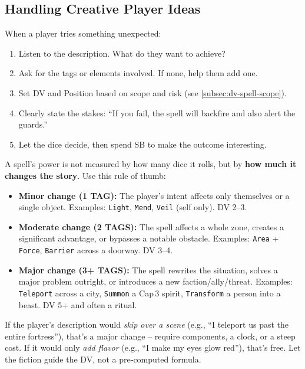 \subsection*{Handling Creative Player Ideas}
When a player tries something unexpected:
\begin{enumerate}
  \item Listen to the description. What do they want to achieve?
  \item Ask for the tags or elements involved. If none, help them add one.
  \item Set DV and Position based on scope and risk (see \ref{subsec:dv-spell-scope}).
  \item Clearly state the stakes: ``If you fail, the spell will backfire and also alert the guards.''
  \item Let the dice decide, then spend SB to make the outcome interesting.
\end{enumerate}

\begin{tcolorbox}[
  colback=yellow!5,
  colframe=yellow!75!black,
  title=When in Doubt, Measure Tags by Narrative Impact,
  fonttitle=\bfseries
]
A spell’s power is not measured by how many dice it rolls, but by \textbf{how much it changes the story}. Use this rule of thumb:

\begin{itemize}
  \item \textbf{Minor change (1 TAG):} The player’s intent affects only themselves or a single object. Examples: \texttt{Light}, \texttt{Mend}, \texttt{Veil} (self only). DV 2–3.
  \item \textbf{Moderate change (2 TAGS):} The spell affects a whole zone, creates a significant advantage, or bypasses a notable obstacle. Examples: \texttt{Area} + \texttt{Force}, \texttt{Barrier} across a doorway. DV 3–4.
  \item \textbf{Major change (3+ TAGS):} The spell rewrites the situation, solves a major problem outright, or introduces a new faction/ally/threat. Examples: \texttt{Teleport} across a city, \texttt{Summon} a Cap 3 spirit, \texttt{Transform} a person into a beast. DV 5+ and often a ritual.
\end{itemize}

If the player’s description would \emph{skip over a scene} (e.g., “I teleport us past the entire fortress”), that’s a major change – require components, a clock, or a steep cost. If it would only \emph{add flavor} (e.g., “I make my eyes glow red”), that’s free. Let the fiction guide the DV, not a pre‑computed formula.
\end{tcolorbox}


